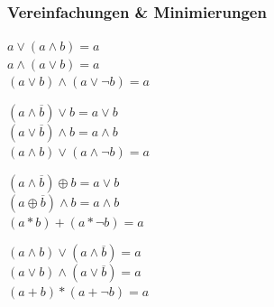 \subsubsection{Vereinfachungen \& Minimierungen}
	\begin{multicols}{4}
		$ a \vee (a \wedge b) = a $ \\
		$ a \wedge (a \vee b) = a $ \\
		$ (a \vee b) \wedge (a \vee \neg b) = a $ 
	\columnbreak
	
		$ (a \wedge \overline{b}) \vee b = a \vee b $ \\
		$ (a \vee \overline{b}) \wedge b = a \wedge b $ \\
		$ (a \wedge b) \vee (a \wedge \neg b) = a $ 
	\columnbreak
	
		$ (a \wedge \overline{b}) \oplus b = a \vee b $ \\
		$ (a \oplus \overline{b}) \wedge b = a \wedge b $ \\
		$ (a * b) + (a * \neg b) = a $ 
	\columnbreak
		
		$ (a \wedge b) \vee (a \wedge \overline{b}) = a $\\	
		$ (a \vee b) \wedge (a \vee \overline{b}) = a $ \\
		$ (a + b) * (a + \neg b) = a $ 
	\end{multicols}




